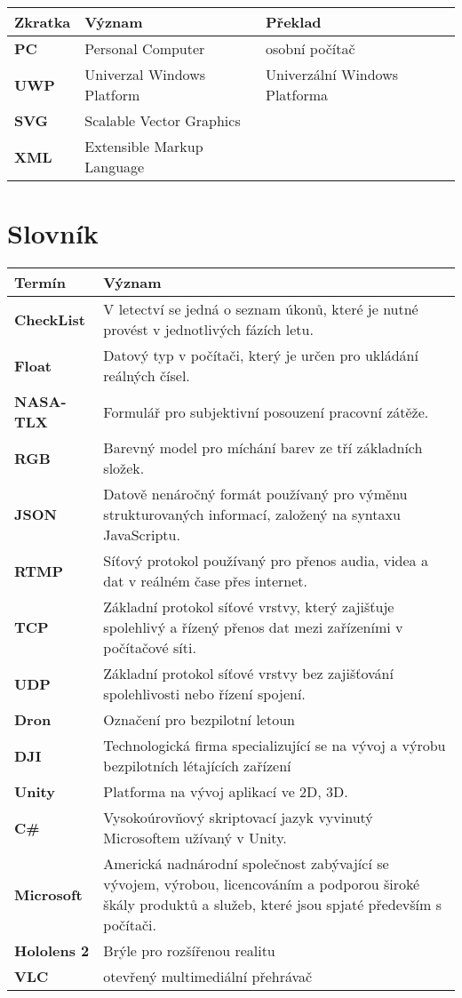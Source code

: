 \documentclass[zadani]{fitthesis} %
\begin{document}
     \chapter*{}
    \bgroup
    \def\arraystretch{1.6}
    \begin{tabular}{ >{\bfseries}p{6.5em} p{5.9cm}  p{5.9cm} }
    \bfseries{Zkratka} & \bfseries{Význam} & \bfseries{Překlad} \\ 
    \hline
    PC &Personal Computer &osobní počítač\\
    UWP&Univerzal Windows Platform& Univerzální Windows Platforma \\
    SVG& Scalable Vector Graphics & \\
    XML& Extensible Markup Language& \\
    \end{tabular}
    \egroup

    
    \chapter*{Slovník}
    \bgroup
    \def\arraystretch{1.6}
    \begin{tabular}{>{\bfseries}p{6.5em} p{11.8cm}   }
    \bfseries{Termín} & \bfseries{Význam} \\ 
    \hline
    CheckList & V letectví se jedná o seznam úkonů, které je nutné provést v jednotlivých fázích letu.\\ 
    Float &   Datový typ v počítači, který je určen pro ukládání reálných čísel.\\ 
    NASA-TLX & Formulář pro subjektivní posouzení pracovní zátěže.  \\ 
    RGB &   Barevný model pro míchání barev ze tří základních složek.\\ 
    JSON &  Datově nenáročný formát používaný pro výměnu strukturovaných informací, založený na syntaxu JavaScriptu.\\ 
    RTMP& Síťový protokol používaný pro přenos audia, videa a dat v reálném čase přes internet. \\ 
    TCP &Základní protokol síťové vrstvy, který zajišťuje spolehlivý a řízený přenos dat mezi zařízeními v počítačové síti. \\ 
    UDP &Základní protokol síťové vrstvy bez zajišťování spolehlivosti nebo řízení spojení. \\ 
    Dron& Označení pro bezpilotní letoun \\ 
    DJI& Technologická firma specializující se na vývoj a výrobu bezpilotních létajících zařízení \\ 
    Unity& Platforma na vývoj aplikací ve 2D, 3D.  \\ 
    C\#& Vysokoúrovňový skriptovací jazyk vyvinutý Microsoftem užívaný  v Unity.  \\ 
    Microsoft& Americká nadnárodní společnost zabývající se vývojem, výrobou, licencováním a podporou široké škály produktů a služeb, které jsou spjaté především s počítači. \\ 
    Hololens 2& Brýle pro rozšířenou realitu\\
    VLC &otevřený multimediální přehrávač\\ 
    
    \end{tabular}
\end{document}
